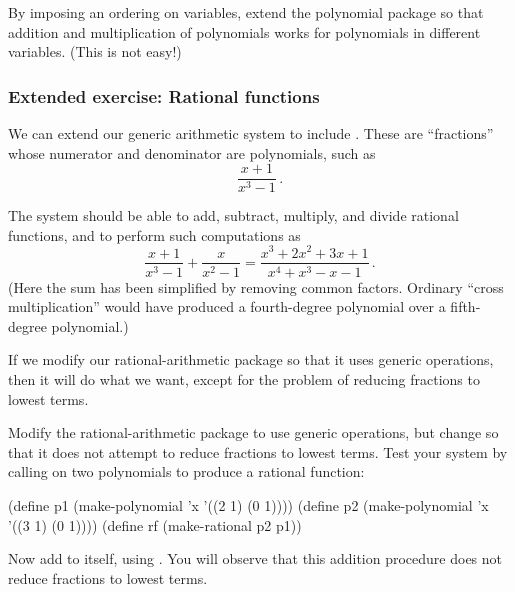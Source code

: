 \begin{exercise}
	\label{Exercise 2.92}
	By imposing an ordering on variables, extend the polynomial package so that addition and multiplication of polynomials works for polynomials in different variables.
	(This is not easy!)
\end{exercise}



\subsubsection*{Extended exercise: Rational functions}

We can extend our generic arithmetic system to include .
These are “fractions” whose numerator and denominator are polynomials, such as
\[
	\frac{x + 1}{x^3 - 1} \,.
\]

The system should be able to add, subtract, multiply, and divide rational functions, and to perform such computations as
\[
	\frac{x + 1}{x^3 - 1} + \frac{x}{x^2 - 1}
	=
	\frac{x^3 + 2 x^2 + 3 x + 1}{x^4 + x^3 - x - 1} \,.
\]
(Here the sum has been simplified by removing common factors.
Ordinary “cross multiplication” would have produced a fourth-degree polynomial over a fifth-degree polynomial.)

If we modify our rational-arithmetic package so that it uses generic operations, then it will do what we want, except for the problem of reducing fractions to lowest terms.



\begin{exercise}
	\label{Exercise 2.93}
	Modify the rational-arithmetic package to use generic operations, but change  so that it does not attempt to reduce fractions to lowest terms.
	Test your system by calling  on two polynomials to produce a rational function:
	\begin{scheme}
	  (define p1 (make-polynomial 'x '((2 1) (0 1))))
	  (define p2 (make-polynomial 'x '((3 1) (0 1))))
	  (define rf (make-rational p2 p1))
	\end{scheme}
	Now add  to itself, using .
	You will observe that this addition procedure does not reduce fractions to lowest terms.
\end{exercise}



